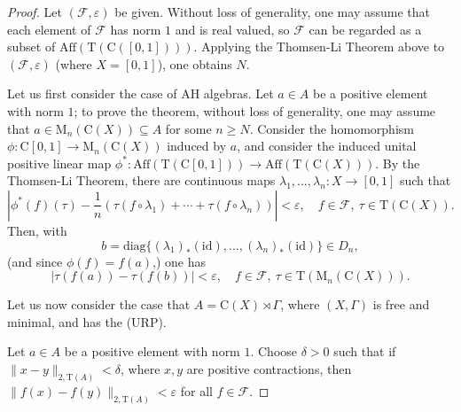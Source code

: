 \documentclass[12pt, oneside, psamsfonts]{amsart}
\theoremstyle{definition}
\theoremstyle{remark}
\numberwithin{equation}{section}
\newcommand{\norm}[1]{\| #1\|}
\newcommand{\abs}[1]{| #1 |}
\newcommand{\eps}{\varepsilon}
\newcommand{\tr}{\mathrm{T}}
\begin{document}
\begin{proof}
Let $(\mathcal F, \eps)$ be given. Without loss of generality, one may assume that each element of $\mathcal F$ has norm $1$ and is real valued,  so $\mathcal F$ can be regarded as a subset of $\mathrm{Aff}(\tr(\mathrm{C}([0, 1])))$.  Applying the Thomsen-Li Theorem above to $(\mathcal F, \eps)$ (where $X = [0, 1]$), one obtains $N$.

Let us first consider the case of AH algebras. Let $a \in A$ be a positive element with norm $1$; to prove the theorem, without loss of generality, one may assume that $a \in \mathrm{M}_n(\mathrm{C}(X)) \subseteq A$ for some $n \geq N$. Consider the homomorphism $\phi: \mathrm{C}[0, 1] \to \mathrm{M}_n(\mathrm{C}(X))$ induced by $a$, and consider the induced unital positive linear map $\phi^*: \mathrm{Aff}( \tr(\mathrm{C}[0, 1])) \to \mathrm{Aff}(\tr(\mathrm{C}(X)))$. By the Thomsen-Li Theorem, there are continuous maps $\lambda_1, ..., \lambda_n: X \to [0, 1]$ such that 
$$ \abs{\phi^*(f)(\tau) - \frac{1}{n}(\tau(f \circ \lambda_1) + \cdots + \tau(f \circ \lambda_n))} < \eps,\quad f\in \mathcal F,\  \tau \in \tr(\mathrm{C}(X)).$$
Then, with $$b = \mathrm{diag}\{(\lambda_1)_*(\mathrm{id}) , ..., (\lambda_n)_*(\mathrm{id})\} \in D_n,$$
(and since $\phi(f) = f(a)$,) one has 
$$ \abs{\tau(f(a)) - \tau(f(b))} < \eps,\quad  f\in \mathcal F,\ \tau \in \tr(\mathrm{M}_n(\mathrm{C}(X))).$$

Let us now consider the case that $A = \mathrm{C}(X) \rtimes \Gamma$, where $(X, \Gamma)$ is free and minimal, and has the (URP). 

Let $a \in A$ be a positive element with norm $1$. Choose $\delta>0$ such that if $\norm{x - y}_{2, \tr(A)} < \delta$, where $x, y$ are positive contractions, then $\norm{f(x) - f(y)}_{2, \tr(A)} < \eps$  for all $f \in \mathcal F$.


\end{proof}
\end{document}
